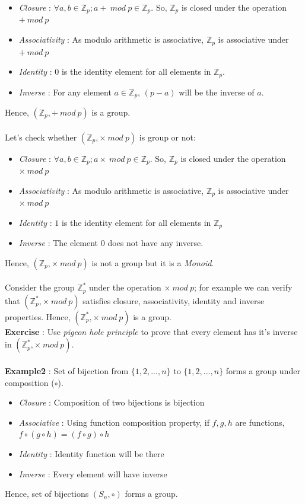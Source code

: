 \begin{itemize}
\item \emph{Closure} : $\forall a, b\in \mathbb{Z}_p; a+ \ mod \ p\in \mathbb{Z}_p$. So, $\mathbb{Z}_p$ is closed under the operation $+ \ mod \ p$
\item \emph{Associativity} : As modulo arithmetic is associative, $\mathbb{Z}_p$ is associative under $+ \ mod \ p$
\item \emph{Identity} : $0$ is the identity element for all elements in $\mathbb{Z}_p$. 
\item \emph{Inverse} : For any element $a\in \mathbb{Z}_p$, $(p-a)$ will be the inverse of $a$.
\end{itemize}
Hence, $(\mathbb{Z}_p,+ \ mod \ p) $ is a group.
\paragraph{}
Let's check whether $(\mathbb{Z}_p,\times \ mod  \ p) $ is group or not:
\begin{itemize}
\item \emph{Closure} : $\forall a, b\in \mathbb{Z}_p; a\times \ mod \ p\in \mathbb{Z}_p$. So, $\mathbb{Z}_p$ is closed under the operation $\times \ mod \ p$
\item \emph{Associativity} : As modulo arithmetic is associative, $\mathbb{Z}_p$ is associative under $\times \ mod \ p$
\item \emph{Identity} : $1$ is the identity element for all elements in $\mathbb{Z}_p$
\item \emph{Inverse} : The element $0$ does not have any inverse.
\end{itemize}
Hence, $(\mathbb{Z}_p,\times \ mod  \ p) $ is not a group but it is a \emph{Monoid}.
\paragraph{}
Consider the group $\mathbb{Z}_p^* $ under the operation $\times \ mod  \ p $; for example we can verify that $(\mathbb{Z}_p^*,\times \ mod  \ p) $ satisfies closure, associativity, identity and inverse properties. Hence, $(\mathbb{Z}_p^*,\times \ mod  \ p) $ is a group.\\
\textbf{Exercise} : Use \emph{pigeon hole principle} to prove that every element has it's inverse in  $(\mathbb{Z}_p^*,\times \ mod  \ p) $.
\paragraph{}
\textbf{Example2} : Set of bijection from $\{1,2,...,n\} $ to $\{1,2,...,n\}$ forms a group under composition ($\circ $).
\begin{itemize}
\item \emph{Closure} : Composition of two bijections is bijection
\item \emph{Associative} : Using function composition property, if $f,g,h$ are functions, $f\circ(g\circ h)=(f\circ g)\circ h$
\item \emph{Identity} : Identity function will be there
\item \emph{Inverse} : Every element will have inverse
\end{itemize}
Hence, set of bijections $(S_n,\circ) $ forms a group.
